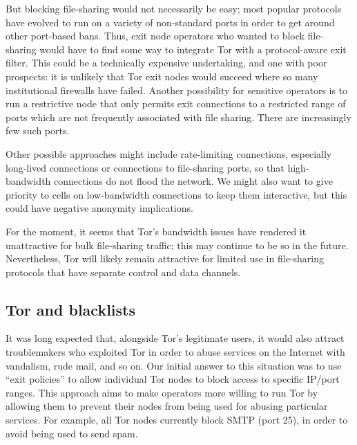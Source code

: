 \documentclass{llncs}
\begin{document}
But blocking file-sharing would not necessarily be easy; most popular
protocols have evolved to run on a variety of non-standard ports in order to
get around other port-based bans.  Thus, exit node operators who wanted to
block file-sharing would have to find some way to integrate Tor with a
protocol-aware exit filter.  This could be a technically expensive
undertaking, and one with poor prospects: it is unlikely that Tor exit nodes
would succeed where so many institutional firewalls have failed.  Another
possibility for sensitive operators is to run a restrictive node that
only permits exit connections to a restricted range of ports which are
not frequently associated with file sharing.  There are increasingly few such
ports.

Other possible approaches might include rate-limiting connections, especially
long-lived connections or connections to file-sharing ports, so that
high-bandwidth connections do not flood the network.  We might also want to
give priority to cells on low-bandwidth connections to keep them interactive,
but this could have negative anonymity implications.

For the moment, it seems that Tor's bandwidth issues have rendered it
unattractive for bulk file-sharing traffic; this may continue to be so in the
future.  Nevertheless, Tor will likely remain attractive for limited use in
file-sharing protocols that have separate control and data channels.



\subsection{Tor and blacklists}
\label{subsec:tor-and-blacklists}

It was long expected that, alongside Tor's legitimate users, it would also
attract troublemakers who exploited Tor in order to abuse services on the
Internet with vandalism, rude mail, and so on.
Our initial answer to this situation was to use ``exit policies''
to allow individual Tor nodes to block access to specific IP/port ranges.
This approach aims to make operators more willing to run Tor by allowing
them to prevent their nodes from being used for abusing particular
services.  For example, all Tor nodes currently block SMTP (port 25), in
order to avoid being used to send spam.
\end{document}

